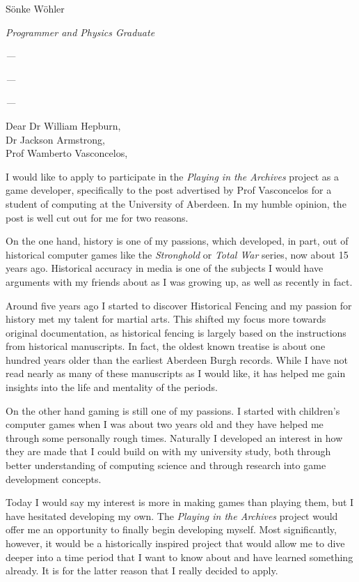 \documentclass[paper=a4,fontsize=11pt]{scrartcl} %
\newcommand{\sepspace}{\vspace*{1em}}		%
\newcommand{\MyName}[1]{ %
  \Huge \usefont{OT1}{phv}{b}{n} \hfill #1
  \par \normalsize \normalfont}
\newcommand{\MySlogan}[4]{ %
  \large \usefont{OT1}{phv}{m}{n}\hfill \textit{#1} 
  \sepspace
  \par \normalsize \usefont{OT1}{phv}{m}{n}\hfill \textit{#2}
  \par \normalsize \usefont{OT1}{phv}{m}{n}\hfill \textit{#3}
  \par \normalsize \usefont{OT1}{phv}{m}{n}\hfill \textit{#4}
  \par \normalsize \normalfont}
\begin{document}
  
  \MyName{S\"onke W\"ohler}
  \MySlogan{Programmer and Physics Graduate}{---}{---}{---}
  
  \noindent
  Dear Dr William Hepburn, \\
  Dr Jackson Armstrong, \\
  Prof Wamberto Vasconcelos,
  
  \sepspace
  
    \noindent
    I would like to apply to participate in the \textit{Playing in the Archives} project as a game developer, specifically to the post advertised by Prof Vasconcelos for a student of computing at the University of Aberdeen. In my humble opinion, the post is well cut out for me for two reasons.
    \sepspace
    
    
    \noindent
    On the one hand, history is one of my passions, which developed, in part, out of historical computer games like the \textit{Stronghold} or \textit{Total War} series, now about 15 years ago. Historical accuracy in media is one of the subjects I would have arguments with my friends about as I was growing up, as well as recently in fact. 
    \sepspace
    
    \noindent
    Around five years ago I started to discover Historical Fencing and my passion for history met my talent for martial arts. This shifted my focus more towards original documentation, as historical fencing is largely based on the instructions from historical manuscripts. In fact, the oldest known treatise is about one hundred years older than the earliest Aberdeen Burgh records. While I have not read nearly as many of these manuscripts as I would like, it has helped me gain insights into the life and mentality of the periods.
    \sepspace
    
    
    \noindent
    On the other hand gaming is still one of my passions. I started with children's computer games when I was about two years old and they have helped me through some personally rough times. Naturally I developed an interest in how they are made that I could build on with my university study, both through better understanding of computing science and through research into game development concepts.
    \sepspace
    
    \noindent
    Today I would say my interest is more in making games than playing them, but I have hesitated developing my own. The \textit{Playing in the Archives} project would offer me an opportunity to finally begin developing myself. Most significantly, however, it would be a historically inspired project that would allow me to dive deeper into a time period that I want to know about and have learned something already. It is for the latter reason that I really decided to apply. 
    \sepspace
    
\end{document}
